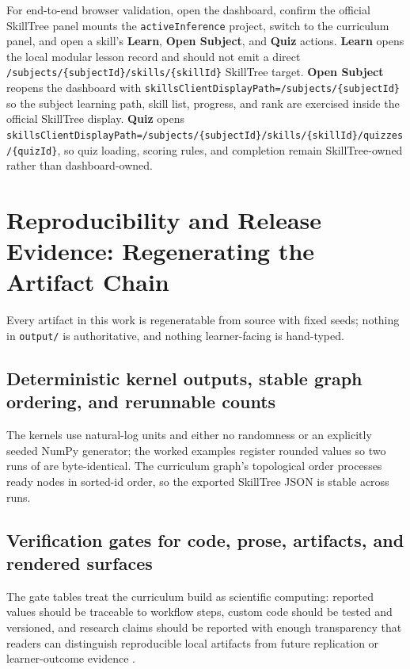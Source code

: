 \documentclass[
  english,
]{article}
\begin{document}
For end-to-end browser validation, open the dashboard, confirm the
official SkillTree panel mounts the \texttt{activeInference} project,
switch to the curriculum panel, and open a skill's \textbf{Learn},
\textbf{Open Subject}, and \textbf{Quiz} actions. \textbf{Learn} opens
the local modular lesson record and should not emit a direct
\texttt{/subjects/\{subjectId\}/skills/\{skillId\}} SkillTree target.
\textbf{Open Subject} reopens the dashboard with
\texttt{skillsClientDisplayPath=/subjects/\{subjectId\}} so the subject
learning path, skill list, progress, and rank are exercised inside the
official SkillTree display. \textbf{Quiz} opens
\texttt{skillsClientDisplayPath=/subjects/\{subjectId\}/skills/\{skillId\}/quizzes/\{quizId\}},
so quiz loading, scoring rules, and completion remain SkillTree-owned
rather than dashboard-owned.

\newpage

\section{Reproducibility and Release Evidence: Regenerating the Artifact
Chain}\label{sec:reproducibility}

Every artifact in this work is regeneratable from source with fixed
seeds; nothing in \texttt{output/} is authoritative, and nothing
learner-facing is hand-typed.

\subsection{Deterministic kernel outputs, stable graph ordering, and
rerunnable
counts}\label{deterministic-kernel-outputs-stable-graph-ordering-and-rerunnable-counts}

The kernels use natural-log units and either no randomness or an
explicitly seeded NumPy generator; the worked examples register rounded
values so two runs of  are
byte-identical. The curriculum graph's topological order processes ready
nodes in sorted-id order, so the exported SkillTree JSON is stable
across runs.

\subsection{Verification gates for code, prose, artifacts, and rendered
surfaces}\label{verification-gates-for-code-prose-artifacts-and-rendered-surfaces}

The gate tables treat the curriculum build as scientific computing:
reported values should be traceable to workflow steps, custom code
should be tested and versioned, and research claims should be reported
with enough transparency that readers can distinguish reproducible local
artifacts from future replication or learner-outcome evidence
\citep{sandve2013reproducible, wilson2014scientific_computing, munafo2017reproducible_science}.
\end{document}
